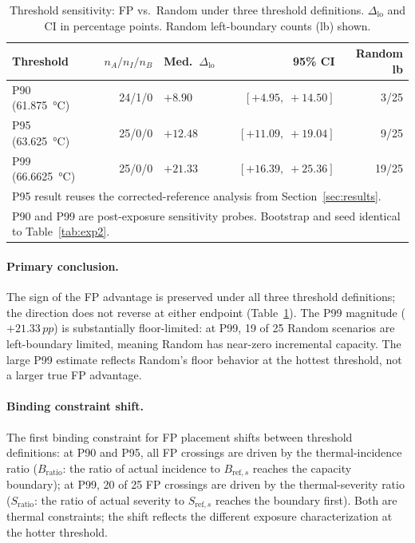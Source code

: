 \documentclass[acmsmall,screen,review,anonymous]{acmart}
\newcommand{\dlo}{\ensuremath{\Delta_{\mathrm{lo}}}\xspace}
\newcommand{\pp}{\,pp\xspace}
\begin{document}
\begin{table}[t]
\caption{Threshold sensitivity: FP vs.\ Random under three threshold definitions.
$\dlo$ and CI in percentage points.  Random left-boundary counts (lb) shown.}
\label{tab:thresh}
\begin{tabular}{lrlrr}
\toprule
Threshold & $n_A/n_I/n_B$ & Med.\ $\dlo$ & 95\% CI & Random lb \\
\midrule
P90 (\SI{61.875}{\celsius}) & 24/1/0 & $+8.90$ & $[+4.95,\;+14.50]$ & 3/25 \\
P95 (\SI{63.625}{\celsius}) & 25/0/0 & $+12.48$ & $[+11.09,\;+19.04]$ & 9/25 \\
P99 (\SI{66.6625}{\celsius}) & 25/0/0 & $+21.33$ & $[+16.39,\;+25.36]$ & 19/25 \\
\bottomrule
\multicolumn{5}{l}{\footnotesize P95 result reuses the corrected-reference analysis from Section~\ref{sec:results}.} \\
\multicolumn{5}{l}{\footnotesize P90 and P99 are post-exposure sensitivity probes. Bootstrap and seed identical to Table~\ref{tab:exp2}.}
\end{tabular}
\end{table}

\paragraph{Primary conclusion.}
The sign of the FP advantage is preserved under all three threshold definitions;
the direction does not reverse at either endpoint (Table~\ref{tab:thresh}).
The P99 magnitude ($+21.33\pp$) is substantially floor-limited: at P99, 19 of 25
Random scenarios are left-boundary limited, meaning Random has near-zero incremental
capacity.  The large P99 estimate reflects Random's floor behavior at the hottest
threshold, not a larger true FP advantage.

\paragraph{Binding constraint shift.}
The first binding constraint for FP placement shifts between threshold definitions:
at P90 and P95, all FP crossings are driven by the thermal-incidence ratio ($B_\mathrm{ratio}$:
the ratio of actual incidence to $B_{\mathrm{ref},s}$ reaches the capacity boundary);
at P99, 20 of 25 FP crossings are driven by the thermal-severity ratio ($S_\mathrm{ratio}$:
the ratio of actual severity to $S_{\mathrm{ref},s}$ reaches the boundary first).
Both are thermal constraints; the shift reflects the different exposure characterization
at the hotter threshold.
\end{document}
